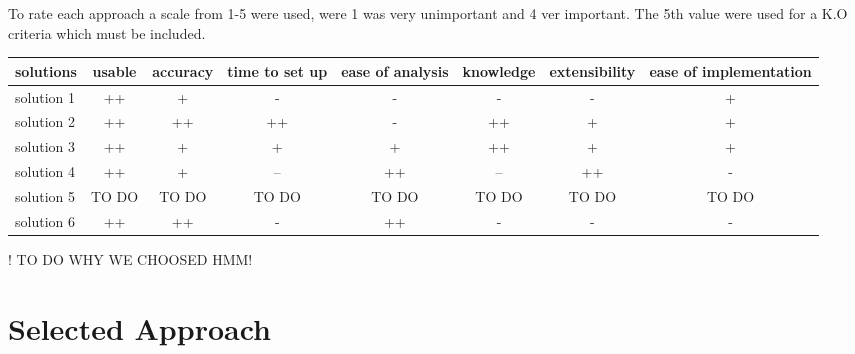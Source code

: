 To rate each approach a scale from 1-5 were used, were 1 was very unimportant and 4 ver important. The 5th value were used for a K.O criteria which must be included.

\begin{table}[h]
\begin{tabular}{|l|c|c|c|c|c|c|c|}
\hline
\textbf{solutions} & usable & accuracy & time to set up & ease of analysis & knowledge & extensibility & ease of implementation \\
\hline
solution 1 &\cellcolor[HTML]{38761d}++&\cellcolor[HTML]{93c47d}+&\cellcolor[HTML]{dd7e6b}-&\cellcolor[HTML]{dd7e6b}-&\cellcolor[HTML]{dd7e6b}-&\cellcolor[HTML]{dd7e6b}-&\cellcolor[HTML]{93c47d}+ \\
\hline
solution 2 &\cellcolor[HTML]{38761d}++&\cellcolor[HTML]{38761d}++&\cellcolor[HTML]{38761d}++&\cellcolor[HTML]{dd7e6b}-&\cellcolor[HTML]{38761d}++&\cellcolor[HTML]{93c47d}+&\cellcolor[HTML]{93c47d}+\\
\hline
solution 3 &\cellcolor[HTML]{38761d}++&\cellcolor[HTML]{93c47d}+&\cellcolor[HTML]{93c47d}+&\cellcolor[HTML]{93c47d}+&\cellcolor[HTML]{38761d}++&\cellcolor[HTML]{93c47d}+&\cellcolor[HTML]{93c47d}+\\
\hline
solution 4 &\cellcolor[HTML]{38761d}++&\cellcolor[HTML]{93c47d}+&\cellcolor[HTML]{cc4125}--&\cellcolor[HTML]{38761d}++&\cellcolor[HTML]{cc4125}--&\cellcolor[HTML]{38761d}++&\cellcolor[HTML]{dd7e6b}-\\
\hline
solution 5 &TO DO & TO DO & TO DO & TO DO & TO DO & TO DO & TO DO \\
\hline
solution 6 &\cellcolor[HTML]{38761d}++&\cellcolor[HTML]{38761d}++&\cellcolor[HTML]{dd7e6b}-&\cellcolor[HTML]{38761d}++&\cellcolor[HTML]{dd7e6b}-&\cellcolor[HTML]{dd7e6b}-&\cellcolor[HTML]{dd7e6b}-\\
\hline
\end{tabular}
\end{table}

! TO DO WHY WE CHOOSED HMM!

\section{Selected Approach}
 



